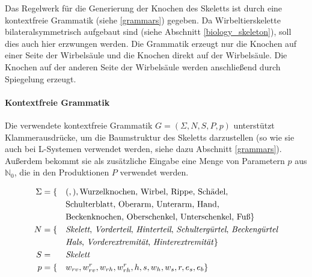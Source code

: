 Das Regelwerk für die Generierung der Knochen des Skeletts ist durch eine kontextfreie Grammatik (siehe \ref{grammars}) gegeben. Da Wirbeltierskelette bilateralsymmetrisch aufgebaut sind (siehe Abschnitt \ref{biology_skeleton}), soll dies auch hier erzwungen werden. Die Grammatik erzeugt nur die Knochen auf einer Seite der Wirbelsäule und die Knochen direkt auf der Wirbelsäule. Die Knochen auf der anderen Seite der Wirbelsäule werden anschließend durch Spiegelung erzeugt.

\paragraph{Kontextfreie Grammatik}
Die verwendete kontextfreie Grammatik $G = (\Sigma, N, S, P, p)$ unterstützt Klammerausdrücke, um die Baumstruktur des Skeletts darzustellen (so wie sie auch bei L-Systemen verwendet werden, siehe dazu Abschnitt \ref{grammars}). Außerdem bekommt sie als zusätzliche Eingabe eine Menge von Parametern $p$ aus $\mathbb{N}_0$, die in den Produktionen $P$ verwendet werden.

\begin{alignat*}{2}
 \Sigma & = \{&&(, ), \text{Wurzelknochen, Wirbel, Rippe, Schädel,}\\  
        & &&\text{Schulterblatt, Oberarm, Unterarm, Hand,}\\ 
        & &&\text{Beckenknochen, Oberschenkel, Unterschenkel, Fuß}\}\\
 N &= \{&&\text{\emph{Skelett}, \emph{Vorderteil}, \emph{Hinterteil}, \emph{Schultergürtel}, \emph{Beckengürtel}}\\
        & &&\text{\emph{Hals}, \emph{Vorderextremität}, \emph{Hinterextremität}}\}\\
 S &= &&\text{\emph{Skelett}}\\
 p &= \{&&w_{rv}, w_{rv}^r, w_{rh}, w_{rh}^r, h, s, w_h, w_s, r, e_s, e_b \}
\end{alignat*}

